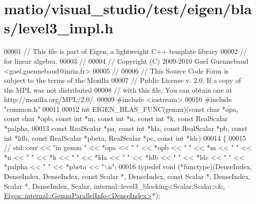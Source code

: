 \hypertarget{matio_2visual__studio_2test_2eigen_2blas_2level3__impl_8h_source}{}\section{matio/visual\+\_\+studio/test/eigen/blas/level3\+\_\+impl.h}
\label{matio_2visual__studio_2test_2eigen_2blas_2level3__impl_8h_source}

\begin{DoxyCode}
00001 \textcolor{comment}{// This file is part of Eigen, a lightweight C++ template library}
00002 \textcolor{comment}{// for linear algebra.}
00003 \textcolor{comment}{//}
00004 \textcolor{comment}{// Copyright (C) 2009-2010 Gael Guennebaud <gael.guennebaud@inria.fr>}
00005 \textcolor{comment}{//}
00006 \textcolor{comment}{// This Source Code Form is subject to the terms of the Mozilla}
00007 \textcolor{comment}{// Public License v. 2.0. If a copy of the MPL was not distributed}
00008 \textcolor{comment}{// with this file, You can obtain one at http://mozilla.org/MPL/2.0/.}
00009 \textcolor{preprocessor}{#include <iostream>}
00010 \textcolor{preprocessor}{#include "common.h"}
00011 
00012 \textcolor{keywordtype}{int} EIGEN\_BLAS\_FUNC(gemm)(\textcolor{keyword}{const} \textcolor{keywordtype}{char} *opa, \textcolor{keyword}{const} \textcolor{keywordtype}{char} *opb, \textcolor{keyword}{const} \textcolor{keywordtype}{int} *m, \textcolor{keyword}{const} \textcolor{keywordtype}{int} *n, \textcolor{keyword}{const} \textcolor{keywordtype}{int} *k, \textcolor{keyword}{const}
       RealScalar *palpha,
00013                           \textcolor{keyword}{const} RealScalar *pa, \textcolor{keyword}{const} \textcolor{keywordtype}{int} *lda, \textcolor{keyword}{const} RealScalar *pb, \textcolor{keyword}{const} \textcolor{keywordtype}{int} *ldb, \textcolor{keyword}{const}
       RealScalar *pbeta, RealScalar *pc, \textcolor{keyword}{const} \textcolor{keywordtype}{int} *ldc)
00014 \{
00015 \textcolor{comment}{//   std::cerr << "in gemm " << *opa << " " << *opb << " " << *m << " " << *n << " " << *k << " " << *lda
       << " " << *ldb << " " << *ldc << " " << *palpha << " " << *pbeta << "\(\backslash\)n";}
00016   \textcolor{keyword}{typedef} void (*functype)(DenseIndex, DenseIndex, DenseIndex, \textcolor{keyword}{const} Scalar *, DenseIndex, \textcolor{keyword}{const} Scalar *, 
      DenseIndex, Scalar *, DenseIndex, Scalar, internal::level3\_blocking<Scalar,Scalar>&, 
      \hyperlink{struct_eigen_1_1internal_1_1_gemm_parallel_info}{Eigen::internal::GemmParallelInfo<DenseIndex>}*);

\end{DoxyCode}
